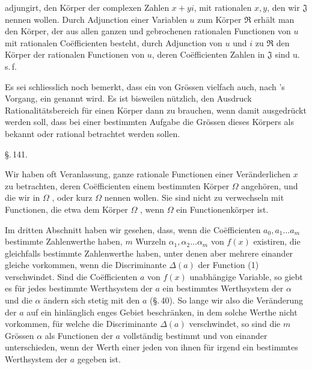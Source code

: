 adjungirt, den K\"orper der complexen Zahlen $x+yi$, mit rationalen $x, y$, den wir $\mathfrak{J}$ nennen wollen. Durch Adjunction einer Variablen $u$ zum K\"orper $\mathfrak{R}$ erh\"alt man den K\"orper, der aus allen ganzen und gebrochenen rationalen Functionen von $u$ mit rationalen Co\"efficienten besteht, durch Adjunction von $u$ und $i$ zu $\mathfrak{R}$ den K\"orper der rationalen Functionen von $u$, deren Co\"efficienten Zahlen in $\mathfrak{J}$ sind u.\,s.\,f.

Es sei schliesslich noch bemerkt, dass ein  von Gr\"ossen vielfach auch, nach 's Vorgang, ein  genannt wird. Es ist bisweilen n\"utzlich, den Ausdruck Rationalit\"atsbereich f\"ur einen K\"orper dann zu brauchen, wenn damit ausgedr\"uckt werden soll, dass bei einer bestimmten Aufgabe die Gr\"ossen dieses K\"orpers als bekannt oder rational betrachtet werden sollen.

\begin{center}
\S.\,141.

\end{center}

Wir haben oft Veranlassung, ganze rationale Functionen einer Ver\"anderlichen $x$
zu betrachten, deren Co\"efficienten einem bestimmten K\"orper $\Omega$ angeh\"oren, und die wir in $\Omega$ , oder kurz  $\Omega$ nennen wollen. Sie sind nicht zu verwechseln mit Functionen, die etwa dem K\"orper $\Omega$ , wenn $\Omega$ ein Functionenk\"orper ist.

Im dritten Abschnitt haben wir gesehen, dass, wenn die Co\"efficienten $a_0, a_1 \ldots a_m$ bestimmte Zahlenwerthe haben, $m$ Wurzeln $\alpha_1, \alpha_2 \ldots \alpha_m$ von $f(x)$ existiren, die gleichfalls bestimmte Zahlenwerthe haben, unter denen aber mehrere einander gleiche vorkommen, wenn die Discriminante $\Delta(a)$ der Function (1) verschwindet. Sind die Co\"efficienten $a$ von $f(x)$ unabh\"angige Variable, so giebt es f\"ur jedes bestimmte Werthsystem der $a$ ein bestimmtes Werthsystem der $\alpha$ und die $\alpha$ \"andern sich stetig mit den $a$ (\S.\,40). So lange wir also die Ver\"anderung der $a$ auf ein hinl\"anglich enges Gebiet beschr\"anken, in dem solche Werthe nicht vorkommen, f\"ur welche die Discriminante $\Delta(a)$ verschwindet, so sind die $m$ Gr\"ossen $\alpha$ als Functionen der $a$ vollst\"andig bestimmt und von einander unterschieden, wenn der Werth einer jeden von ihnen f\"ur irgend ein bestimmtes Werthsystem der $a$ gegeben ist.
